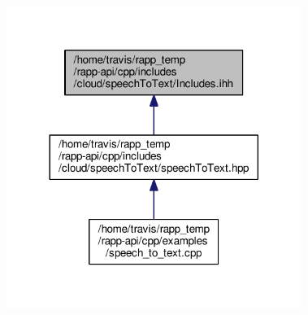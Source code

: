 \begin{figure}[H]
\begin{center}
\leavevmode
\includegraphics[width=272pt]{cloud_2speechToText_2Includes_8ihh__dep__incl}
\end{center}
\end{figure}
